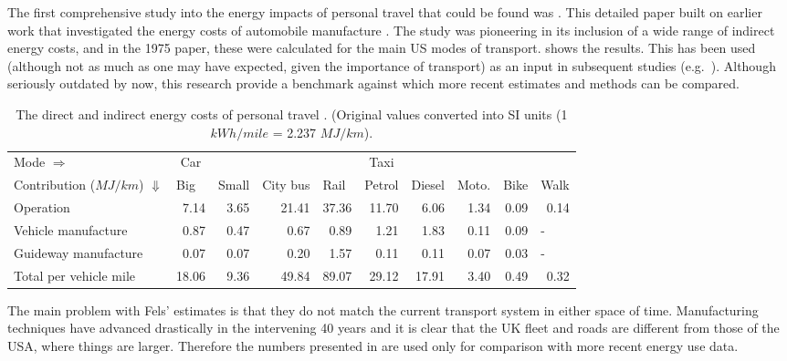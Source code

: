 \documentclass[a4paper, 11pt, twoside]{Thesis}
\begin{document}
The first comprehensive study into the energy impacts of personal travel
that could be found was \citet{Fels1975}. This detailed paper built on earlier
work that investigated the energy costs of automobile manufacture
\citep{Fels1973}. The study was pioneering
in its inclusion of a wide range of indirect energy costs, and in the 1975
paper, these were calculated for the main US modes of transport. 
shows the results. This has been used (although not as much as one may have
expected, given the importance of transport) as an input in subsequent
studies (e.g.~\citealp{Fels-referal-1985}). Although seriously outdated by
now, this research provide a benchmark against which more recent estimates
and methods can be compared.


\begin{table}[h]
\centerline{}
\caption[The direct and indirect energy costs of personal travel
\citep{Fels1975}]{The direct and indirect energy costs of personal travel
\citep{Fels1975}. (Original values  converted into SI units
(1 $kWh/mile$ = 2.237 $MJ/km$).}
\begin{tabular}{p{2.1cm}rrrrrrrrl}
\toprule
 Mode $\Rightarrow$ & \multicolumn{1}{c}{Car} & \multicolumn{1}{l}{} &
\multicolumn{1}{l}{} & \multicolumn{1}{l}{} & \multicolumn{1}{c}{Taxi} &
\multicolumn{1}{l}{} & \multicolumn{1}{l}{} &
\multicolumn{1}{l}{} & \\
Contribution ($MJ/km$) $\Downarrow$ & \multicolumn{1}{l}{Big} &
\multicolumn{1}{l}{Small} & \multicolumn{1}{l}{City bus} &
\multicolumn{1}{l}{Rail} & \multicolumn{1}{l}{Petrol} &
\multicolumn{1}{l}{Diesel}& \multicolumn{1}{l}{Moto.} & \multicolumn{1}{l}{Bike}
& Walk \\
\midrule
Operation  & 7.14 & 3.65 & 21.41 & 37.36 & 11.70 & 6.06 & 1.34 & 0.09 & \multicolumn{1}{r}{0.14} \\
Vehicle manufacture & 0.87 & 0.47 & 0.67 & 0.89 & 1.21 & 1.83 & 0.11 & 0.09 & - \\
Guideway manufacture & 0.07 & 0.07 & 0.20 & 1.57 & 0.11 & 0.11 & 0.07 & 0.03 & - \\
Total per vehicle mile & 18.06 & 9.36 & 49.84 & 89.07 & 29.12 & 17.91 & 3.40 & 0.49 & \multicolumn{1}{r}{0.32} \\
\bottomrule
\end{tabular}
\label{t:fels}
\end{table}

The main problem with Fels' estimates is that they do not match the current
transport system in either space of time. Manufacturing techniques have
advanced drastically in the intervening 40 years and it is clear that the UK
fleet and roads are different from those of the USA, where things are larger.
Therefore the numbers presented in \citet{Fels1975} are
used only for comparison with more recent energy use data.
\end{document}
